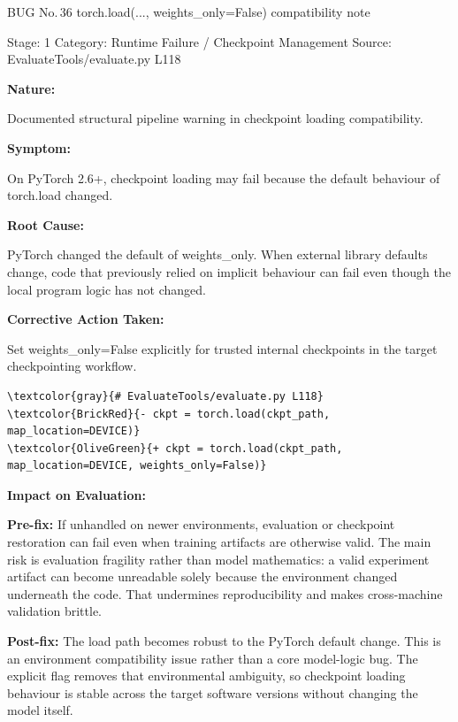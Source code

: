 \documentclass[10pt]{article}
\newcommand{\FieldLabel}[1]{%
 {\bfseries #1:}\par
}
\begin{document}
\begin{notebugbox}{BUG No.\,36 \quad torch.load(..., weights\_only=False) compatibility note}
{\color{MetaGray}\small Stage: 1 \;\textbar\; Category: Runtime Failure / Checkpoint Management \;\textbar\; Source: EvaluateTools/evaluate.py L118\par}
\vspace{0.22em}
\FieldLabel{Nature}
Documented structural pipeline warning in checkpoint loading compatibility.
\par
\vspace{0.35em}
\FieldLabel{Symptom}
On PyTorch 2.6+, checkpoint loading may fail because the default behaviour of torch.load changed.
\par
\vspace{0.35em}
\FieldLabel{Root Cause}
PyTorch changed the default of weights\_only. When external library defaults change, code that previously relied on implicit behaviour can fail even though the local program logic has not changed.
\par
\vspace{0.35em}
\FieldLabel{Corrective Action Taken}
Set weights\_only=False explicitly for trusted internal checkpoints in the target checkpointing workflow.
\par
\vspace{0.35em}
\begin{Verbatim}[commandchars=\\\{\},fontsize=\footnotesize,breaklines=true,breaksymbol={},frame=leftline,framerule=2pt,rulecolor=\color{gray!40},xleftmargin=6pt,formatcom=\singlespacing]
\textcolor{gray}{# EvaluateTools/evaluate.py L118}
\textcolor{BrickRed}{- ckpt = torch.load(ckpt_path, map_location=DEVICE)}
\textcolor{OliveGreen}{+ ckpt = torch.load(ckpt_path, map_location=DEVICE, weights_only=False)}
\end{Verbatim}
\vspace{0.22em}
\FieldLabel{Impact on Evaluation}
\textbf{Pre-fix:} If unhandled on newer environments, evaluation or checkpoint restoration can fail even when training artifacts are otherwise valid. The main risk is evaluation fragility rather than model mathematics: a valid experiment artifact can become unreadable solely because the environment changed underneath the code. That undermines reproducibility and makes cross-machine validation brittle.\par\smallskip
\textbf{Post-fix:} The load path becomes robust to the PyTorch default change. This is an environment compatibility issue rather than a core model-logic bug. The explicit flag removes that environmental ambiguity, so checkpoint loading behaviour is stable across the target software versions without changing the model itself.
\par
\vspace{0.35em}
\end{notebugbox}
\end{document}
